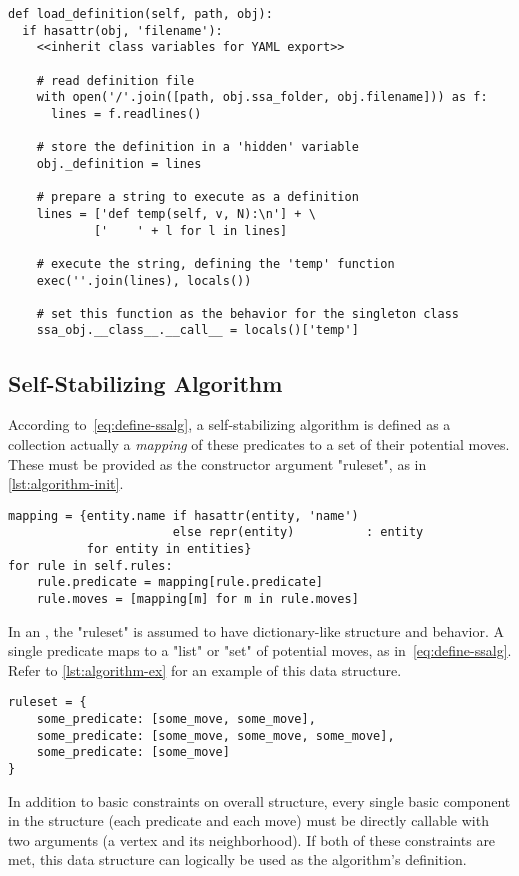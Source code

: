 \begin{lstlisting}[float, caption={Predicates and moves are defined by named files in the bundle.  See also~\autoref{task:smarter-def}.}, label={lst:decorate:overview}]
def load_definition(self, path, obj):
  if hasattr(obj, 'filename'):
    <<inherit class variables for YAML export>>

    # read definition file
    with open('/'.join([path, obj.ssa_folder, obj.filename])) as f:
      lines = f.readlines()

    # store the definition in a 'hidden' variable
    obj._definition = lines

    # prepare a string to execute as a definition
    lines = ['def temp(self, v, N):\n'] + \
            ['    ' + l for l in lines]

    # execute the string, defining the 'temp' function
    exec(''.join(lines), locals())

    # set this function as the behavior for the singleton class
    ssa_obj.__class__.__call__ = locals()['temp']
\end{lstlisting}

\subsection{Self-Stabilizing Algorithm}
\label{sec:logic-repr:self-stab-algor}

According to~\autoref{eq:define-ssalg},
  a self-stabilizing algorithm is defined as a collection
  \Dash actually a \emph{mapping} \Dash 
  of these predicates to a set of their potential moves.
These must be provided as the constructor argument "ruleset",
  as in \autoref{lst:algorithm-init}.
\begin{lstlisting}[float, caption={Each rule must be resolved \emph{after} all predicates and moves have been defined.}, label={lst:algorithm-init}]
mapping = {entity.name if hasattr(entity, 'name')
                       else repr(entity)          : entity
           for entity in entities}
for rule in self.rules:
    rule.predicate = mapping[rule.predicate]
    rule.moves = [mapping[m] for m in rule.moves]
\end{lstlisting}

In an , the "ruleset" is assumed to have
  dictionary-like structure and behavior.
A single predicate maps to a "list" or "set" of potential moves, as in~\autoref{eq:define-ssalg}.
Refer to \autoref{lst:algorithm-ex} for an example of this data structure.
\begin{lstlisting}[float, caption={An example structure to use as an \object{Algorithm}'s \texttt{\small ruleset}}, label={lst:algorithm-ex}]
ruleset = {
    some_predicate: [some_move, some_move],
    some_predicate: [some_move, some_move, some_move],
    some_predicate: [some_move]
}
\end{lstlisting}
In addition to basic constraints on overall structure,
  every single basic component in the structure
  (each predicate and each move)
  must be directly callable with two arguments (a vertex and its neighborhood).
If both of these constraints are met, this data structure can logically be used as the algorithm's definition.

